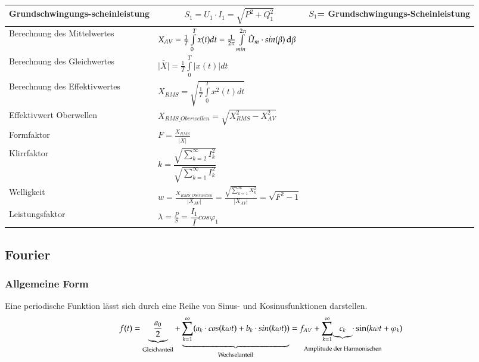 \begin{longtable}{| p{} | p{} |p{}|}
    \textbf{\color{green}Grundschwingungs-\newline scheinleistung}&
    \vspace{-0.5cm}\[ S_1=U_1\cdot I_1 = \sqrt{P^2+Q_1^2}\]\vspace{-0.5cm}&
    $ S_1 $= Grundschwingungs-Scheinleistung
    \\ \hline    
    \hline
    Berechnung des Mittelwertes&
    $X_{AV} = \frac{1}{T}\int\limits_{0}^{T}x(t)dt = \frac{1}{2\pi}\int\limits_{min}^{2\pi}\hat{U}_m\cdot sin(\beta)\mathop{}\!\mathrm{d} \beta$
    &\\
    \hline
    Berechnung des Gleichwertes
    & $\overline{|X|} = \frac{1}{T} \int\limits_{0}^{T} |x(t)|dt$
    &\\
    \hline
    Berechnung des Effektivwertes
    & $X_{RMS} = \sqrt{\frac{1}{T}\int\limits_{0}^{T}x^2(t)dt}$
    &\\
    \hline
    Effektivwert Oberwellen
    & $X_{RMS\_Oberwellen} = \sqrt{X_{RMS}^2 - X_{AV}^2}$
    &\\
    \hline
    Formfaktor
    & $F = \frac{X_{RMS}}{\overline{|X|}}$
    &\\
    \hline
    Klirrfaktor
    &$ k= \dfrac{\sqrt{\sum_{k=2}^{\infty} I_k^2}}{\sqrt{\sum_{k=1}^{\infty} I_k^2}}$
    &\\
    \hline
    Welligkeit
    & $w = \frac{X_{RMS\_Oberwellen}}{|X_{AV}|}= \frac{\sqrt{\sum\limits_{k = 1}^{\infty}X_{k}^2}}{|X_{AV}|} = \sqrt{F^2-1}$
    &\\
    \hline
    Leistungsfaktor&
    $ \lambda = \frac{P}{S} = \dfrac{I_1}{I}cos\varphi_1 $
    & \\ \hline 
\end{longtable}
\clearpage
\subsection{Fourier}
\subsubsection{Allgemeine Form}
Eine periodische Funktion lässt sich durch eine Reihe von Sinus- und Kosinusfunktionen darstellen.
$$f(t) = \underbrace{\frac{a_{0}}{2}}_{\text{Gleichanteil}}+\underbrace{\sum_{k = 1}^{\infty} (a_{k} \cdot cos(k \omega t)+ b_{k} \cdot sin(k \omega t))}_{\text{Wechselanteil}} = f_{AV}+ \sum_{k = 1}^{\infty}\hspace{-1.3cm} \underbrace{c_k}_{\substack{\scriptsize \\[0.1cm]\text{Amplitude der Harmonischen}}}\hspace{-1.3cm} \cdot \sin(k\omega t + \varphi_k)$$

